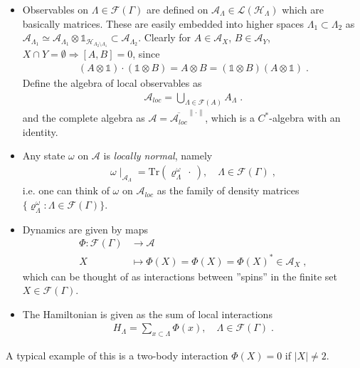 \documentclass[
a4paper, %
11pt, %
onecolumn, %
openany, %
]{memoir}
\theoremstyle{definition}
\theoremstyle{remark}
\theoremstyle{plain}
\begin{document}
\begin{itemize}
\item Observables on $\Lambda\in\mathcal{F}(\Gamma)$ are defined on $\mathcal{A}_{\Lambda}\in\mathcal{L}(\mathcal{H}_{\Lambda})$ which are basically matrices. These are easily embedded into higher spaces $\Lambda_1\subset\Lambda_2$ as $\mathcal{A}_{\Lambda_1}\simeq \mathcal{A}_{\Lambda_1}\otimes\mathds{1}_{\mathcal{H}_{\Lambda_2\setminus \Lambda_1}}\subset \mathcal{A}_{\Lambda_2}$. Clearly for $A\in\mathcal{A}_X$, $B\in\mathcal{A}_Y$, $X\cap Y=\emptyset\Rightarrow[A,B]=0$, since \begin{align}
(A\otimes \mathds{1})\cdot(\mathds{1}\otimes B)=A\otimes B=(\mathds{1}\otimes B)(A\otimes\mathds{1})\; .
\end{align}
 Define the algebra of local observables as 
\begin{align} 
\mathcal{A}_{loc}=\bigcup_{\Lambda\in\mathcal{F}(A)}A_{\Lambda}\; .
\end{align}
and the complete algebra as $\mathcal{A}=\overline{\mathcal{A}_{loc}}^{\|\cdot\|}$, which is a $C^*$-algebra with an identity. \\
\item Any state $\omega$ on $\mathcal{A}$ is \textit{locally normal}, namely \begin{align}
\omega\mid_{\mathcal{A}_{\Lambda}}=\mathrm{Tr}(\varrho_{\Lambda}^{\omega}~\cdot~),\quad  \Lambda\in\mathcal{F}(\Gamma)\;,
\end{align}
i.e. one can think of $\omega$ on $\mathcal{A}_{loc}$ as the family of density matrices $\{\varrho_{\Lambda}^{\omega}:\Lambda\in\mathcal{F}(\Gamma)\}$.\\
\item Dynamics are given by maps\begin{align}
\Phi:\mathcal{F}(\Gamma)&\longrightarrow \mathcal{A}\\
X &\longmapsto \Phi(X)=\Phi(X)=\Phi(X)^*\in\mathcal{A}_X\; ,
\end{align}
which can be thought of as interactions between ''spins'' in the finite set $X\in\mathcal{F}(\Gamma)$. 
\item The Hamiltonian is given as the sum of local interactions\begin{align}
H_{\Lambda}=\sum_{x\subset\Lambda}\Phi(x),\quad \Lambda\in\mathcal{F}(\Gamma)\; .
\end{align}
\end{itemize}
A typical example of this is a two-body interaction $\Phi(X)=0$ if $|X|\neq 2$.\\
\end{document}
